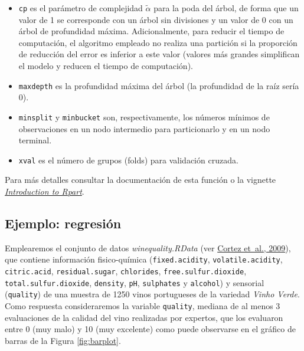 \documentclass[
]{book}
\theoremstyle{break}
\theoremstyle{nonumberplain}
\begin{document}
\begin{itemize}
  \begin{itemize}
  \item
    \texttt{cp} es el parámetro de complejidad \(\tilde \alpha\) para la poda del árbol, de forma que un valor de 1 se corresponde con un árbol sin divisiones y un valor de 0 con un árbol de profundidad máxima.
    Adicionalmente, para reducir el tiempo de computación, el algoritmo empleado no realiza una partición si la proporción de reducción del error es inferior a este valor (valores más grandes simplifican el modelo y reducen el tiempo de computación).
  \item
    \texttt{maxdepth} es la profundidad máxima del árbol (la profundidad de la raíz sería 0).
  \item
    \texttt{minsplit} y \texttt{minbucket} son, respectivamente, los números mínimos de observaciones en un nodo intermedio para particionarlo
    y en un nodo terminal.
  \item
    \texttt{xval} es el número de grupos (folds) para validación cruzada.
  \end{itemize}
\end{itemize}

Para más detalles consultar la documentación de esta función o la vignette \href{https://cran.r-project.org/web/packages/rpart/vignettes/longintro.pdf}{\emph{Introduction to Rpart}}.

\hypertarget{ejemplo-regresiuxf3n}{%
\subsection{Ejemplo: regresión}\label{ejemplo-regresiuxf3n}}

Emplearemos el conjunto de datos \emph{winequality.RData} (ver \protect\hyperlink{ref-cortez2009modeling}{Cortez et~al., 2009}), que contiene información fisico-química
(\texttt{fixed.acidity}, \texttt{volatile.acidity}, \texttt{citric.acid}, \texttt{residual.sugar}, \texttt{chlorides}, \texttt{free.sulfur.dioxide},
\texttt{total.sulfur.dioxide}, \texttt{density}, \texttt{pH}, \texttt{sulphates} y \texttt{alcohol}) y sensorial (\texttt{quality})
de una muestra de 1250 vinos portugueses de la variedad \emph{Vinho Verde}.
Como respuesta consideraremos la variable \texttt{quality}, mediana de al menos 3 evaluaciones de la calidad del vino realizadas por expertos, que los evaluaron entre 0 (muy malo) y 10 (muy excelente) como puede observarse en el gráfico de barras de la Figura \ref{fig:barplot}.
\end{document}
